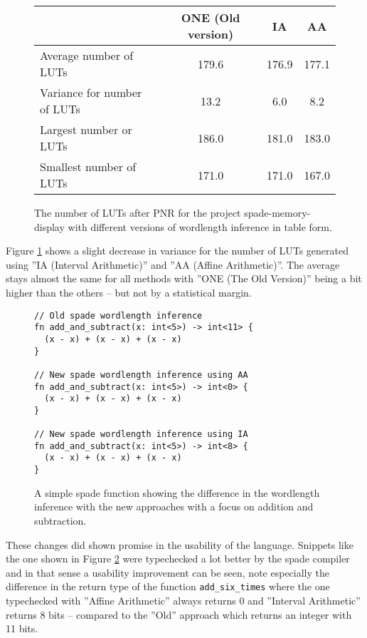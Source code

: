 \begin{figure}
\begin{center}
\begin{tabular}{l | c c c}
  & ONE (Old version) & IA & AA \\
\hline
Average number of LUTs&179.6&176.9 & 177.1 \\
Variance for number of LUTs &13.2&6.0&8.2 \\
Largest number or LUTs&186.0&181.0&183.0 \\
Smallest number of LUTs&171.0&171.0&167.0 \\
\end{tabular}
  \caption{The number of LUTs after PNR for the project spade-memory-display with different versions of wordlength inference in table form.}
  \label{fig:SpadeCompilations50Table}
\end{center}
\end{figure}


Figure \ref{fig:SpadeCompilations50Table} shows a slight decrease in variance for the number of LUTs generated using ''IA (Interval Arithmetic)'' and ''AA (Affine Arithmetic)''. The average stays almost the same for all methods with ''ONE (The Old Version)'' being a bit higher than the others -- but not by a statistical margin.

\begin{figure}
\begin{verbatim}
// Old spade wordlength inference
fn add_and_subtract(x: int<5>) -> int<11> {
  (x - x) + (x - x) + (x - x)
}

// New spade wordlength inference using AA
fn add_and_subtract(x: int<5>) -> int<0> {
  (x - x) + (x - x) + (x - x)
}

// New spade wordlength inference using IA
fn add_and_subtract(x: int<5>) -> int<8> {
  (x - x) + (x - x) + (x - x)
}
\end{verbatim}
  \caption{A simple spade function showing the difference in the wordlength inference with the new approaches with a focus on addition and subtraction.}
  \label{fig:CodeThatWorksNow}
\end{figure}

These changes did shown promise in the usability of the language. Snippets like the one shown in Figure \ref{fig:CodeThatWorksNow} were typechecked a lot better by the spade compiler and in that sense a usability improvement can be seen, note especially the difference in the return type of the function \verb+add_six_times+ where the one typechecked with ''Affine Arithmetic'' always returns 0 and ''Interval Arithmetic'' returns 8 bits -- compared to the ''Old'' approach which returns an integer with 11 bits. %


